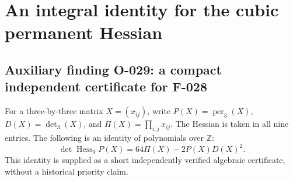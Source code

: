 \section{An integral identity for the cubic permanent Hessian}

\subsection*{Auxiliary finding O-029: a compact independent certificate for F-028}
For a three-by-three matrix \(X=(x_{ij})\), write
\(P(X)=\operatorname{per}_3(X)\), \(D(X)=\det_3(X)\), and
\(\Pi(X)=\prod_{i,j}x_{ij}\).
The Hessian is taken in all nine entries. The following is
an identity of polynomials over \(\mathbb Z\):
\[
           \boxed{\quad
           \det\operatorname{Hess}_9 P(X)
                    =64\Pi(X)-2P(X)D(X)^2.
           \quad}                                             \tag{O-029.1}
\]
This identity is supplied as a short independently verified
algebraic certificate, without a historical priority claim.

